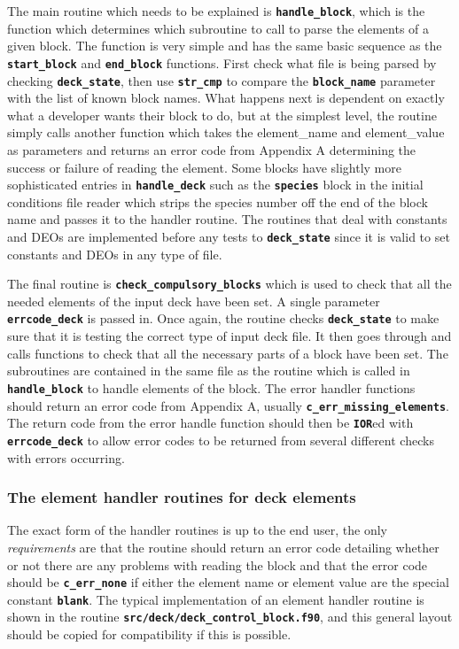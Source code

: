 \documentclass[12pt,a4paper]{article}
\newcommand{\inlinecode}[1]{{\color{warwickred} \bf\texttt{#1}}}
\begin{document}
The main routine which needs to be explained is \inlinecode{handle\_block}, which
is the function which determines which subroutine to call to parse the elements
of a given block. The function is very simple and has the same basic sequence
as the \inlinecode{start\_block} and \inlinecode{end\_block} functions. First check
what file is being parsed by checking \inlinecode{deck\_state}, then use
\inlinecode{str\_cmp} to compare the \inlinecode{block\_name} parameter with the
list of known block names. What happens next is dependent on exactly what a
developer wants their block to do, but at the simplest level, the routine
simply calls another function which takes the element\_name and element\_value as
parameters and returns an error code from Appendix A determining the success or
failure of reading the element. Some blocks have slightly more sophisticated
entries in \inlinecode{handle\_deck} such as the \inlinecode{species} block in
the initial conditions file reader which strips the species number off the end
of the block name and passes it to the handler routine. The routines that deal
with constants and DEOs are implemented before any tests to
\inlinecode{deck\_state} since it is valid to set constants and DEOs in any
type of file.

The final routine is \inlinecode{check\_compulsory\_blocks} which is used to check
that all the needed elements of the input deck have been set. A single
parameter \inlinecode{errcode\_deck} is passed in. Once again, the routine
checks \inlinecode{deck\_state} to make sure that it is testing the correct
type of input deck file. It then goes through and calls functions to check that
all the necessary parts of a block have been set. The subroutines are contained
in the same file as the routine which is called in \inlinecode{handle\_block} to
handle elements of the block. The error handler functions should return an
error code from Appendix A, usually \inlinecode{c\_err\_missing\_elements}. The
return code from the error handle function should then be \inlinecode{IOR}ed
with \inlinecode{errcode\_deck} to allow error codes to be returned from
several different checks with errors occurring.

\subsubsection{The element handler routines for deck elements}
The exact form of the handler routines is up to the end user, the only {\it
requirements} are that the routine should return an error code detailing
whether or not there are any problems with reading the block and that the error
code should be \inlinecode{c\_err\_none} if either the element name or element
value are the special constant \inlinecode{blank}. The typical implementation
of an element handler routine is shown in the routine
\inlinecode{src/deck/deck\_control\_block.f90}, and this general layout should
be copied for compatibility if this is possible.\\
\end{document}
